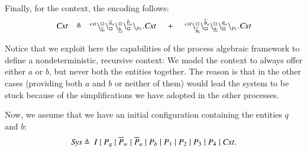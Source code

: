 Finally, for the context, the encoding follows:
\[
\begin{array}{lcl @{\hspace{0.5cm}}c@{\hspace{0.5cm}} l}
\mathit{Cxt} &\defeq &  \startchain{\mathit{cxt}}\chainedlink{\widehat{a}_i}{\noact}\chainedlink{\noact}{\widehat{a}_o}\chainedlink{\underline{b}_i}{\noact}\chainedlink{\noact}{\underline{b}_o}\chainend{p_1}.\mathit{Cxt}
&+
&\startchain{\mathit{cxt}}\chainedlink{\widehat{b}_i}{\noact}\chainedlink{\noact}{\widehat{b}_o}\chainedlink{\underline{a}_i}{\noact}\chainedlink{\noact}{\underline{a}_o}\chainend{p_1}.\mathit{Cxt}\\
\end{array}
\]

Notice that we exploit here the capabilities of the process algebraic framework to define a nondeterministic, recursive context:
We model the context to always offer either $a$ or $b$, but never both the entities together. The reason is that in
the other cases (providing both $a$ and $b$ or neither of them) would lead the system to be stuck because of the simplifications we have adopted in the other processes.

Now, we assume that we have an initial configuration containing the entities $q$ and $b$:
\[
\begin{array}{lcl}
\mathit{Sys}  \defeq \ %
 I\mid P_q \mid \overline{P}_w  \mid  \overline{P}_a  \mid P_b  \mid  P_1  \mid  P_2  \mid  P_3  \mid P_4  \mid \mathit{Cxt}.
\end{array}
\] 

